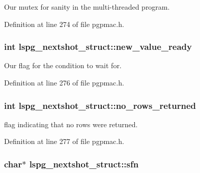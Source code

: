 Our mutex for sanity in the multi-\/threaded program. 



Definition at line 274 of file pgpmac.\-h.

\hypertarget{structlspg__nextshot__struct_adb8da14444b98f556dba9420dd4666dc}{
\subsubsection[{new\-\_\-value\-\_\-ready}]{\setlength{\rightskip}{0pt plus 5cm}int lspg\-\_\-nextshot\-\_\-struct\-::new\-\_\-value\-\_\-ready}}\label{structlspg__nextshot__struct_adb8da14444b98f556dba9420dd4666dc}


Our flag for the condition to wait for. 



Definition at line 276 of file pgpmac.\-h.

\hypertarget{structlspg__nextshot__struct_abc9242805729f70b83df79706c394c71}{
\subsubsection[{no\-\_\-rows\-\_\-returned}]{\setlength{\rightskip}{0pt plus 5cm}int lspg\-\_\-nextshot\-\_\-struct\-::no\-\_\-rows\-\_\-returned}}\label{structlspg__nextshot__struct_abc9242805729f70b83df79706c394c71}


flag indicating that no rows were returned. 



Definition at line 277 of file pgpmac.\-h.

\hypertarget{structlspg__nextshot__struct_a03252bba597b081edc9d08b20b558cc7}{
\subsubsection[{sfn}]{\setlength{\rightskip}{0pt plus 5cm}char$\ast$ lspg\-\_\-nextshot\-\_\-struct\-::sfn}}\label{structlspg__nextshot__struct_a03252bba597b081edc9d08b20b558cc7}


